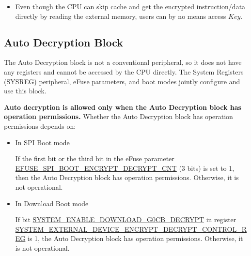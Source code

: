 \documentclass[main\_\_EN.tex]{subfiles}
\begin{document}
\begin{tiplisting}
\vspace{-2em}
\begin{itemize}
\item Even though the CPU can skip cache and get the encrypted instruction/data directly by reading the external memory, users can by no means access \begin{math}Key\end{math}.
\end{itemize}
\end{tiplisting}

\subsection{Auto Decryption Block}

The Auto Decryption block is not a conventional peripheral, so it does not have any registers and cannot be accessed by the CPU directly. The System Registers (SYSREG) peripheral, eFuse parameters, and boot modes jointly configure and use this block.

\textbf{Auto decryption is allowed only when the Auto Decryption block has operation permissions.} Whether the Auto Decryption block has operation permissions depends on:

\begin{itemize}

    \item In SPI Boot mode

    If the first bit or the third bit in the eFuse parameter \hyperref[fielddesc:EFUSESPIBOOTENCRYPTDECRYPTCNT]{EFUSE\_SPI\_BOOT\_ENCRYPT\_DECRYPT\_CNT} (3 bits) is set to 1, then the Auto Decryption block has operation permissions. Otherwise, it is not operational.

    \item In Download Boot mode

    If bit \hyperref[fielddesc:SYSTEMENABLEDOWNLOADG0CBDECRYPT]{SYSTEM\_ENABLE\_DOWNLOAD\_G0CB\_DECRYPT} in register\\ \hyperref[regdesc:SYSTEMEXTERNALDEVICEENCRYPTDECRYPTCONTROLREG]{SYSTEM\_EXTERNAL\_DEVICE\_ENCRYPT\_DECRYPT\_CONTROL\_REG} is 1, the Auto Decryption block has operation permissions. Otherwise, it is not operational.

\end{itemize}
\end{document}
